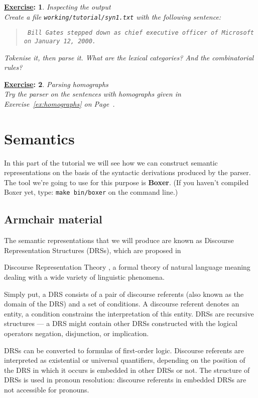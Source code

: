 \documentclass[11pt]{article}
\newtheorem{exercisebb}{\textbf{\underline{Exercise}:}}[section]
\newcommand{\bx}[1]{\begin{exercisebb} \rm #1\\}
\newcommand{\ex}{\end{exercisebb}}
\newcommand{\mnote}[1]
{
  \marginpar{\small #1}
  #1
}
\begin{document}
\bx{Inspecting the output}

Create a file \texttt{working/tutorial/syn1.txt} with the following sentence:

\begin{quote}\tt
Bill Gates stepped down as chief executive officer of Microsoft\\
on January 12, 2000.
\end{quote}

Tokenise it, then parse it. What are the lexical categories? 
And the combinatorial rules?
\ex

\bx{Parsing homographs}
Try the parser on the sentences with homographs given in Exercise~\ref{ex:homographs} on Page~\pageref{ex:homographs}.
\ex




%
%
\clearpage
\section{Semantics}\label{section:semantics}

In this part of the tutorial we will see how we can construct semantic
representations on the basis of the syntactic derivations produced by
the parser. The tool we're going to use for this purpose is
\textbf{Boxer}.  (If you haven't compiled \mnote{Boxer} yet, type:
\texttt{make bin/boxer} on the command line.)

\subsection*{Armchair material}

The semantic representations that we will produce are known as
Discourse Representation Structures (DRSs), which are proposed in
\mnote{Discourse Representation Theory}, a formal theory of natural
language meaning dealing with a wide variety of linguistic phenomena.

Simply put, a DRS consists of a pair of discourse referents
(also known as the domain of the DRS) and a set of conditions.  A
discourse referent denotes an entity, a condition constrains the
interpretation of this entity. DRSs are recursive structures --- a DRS
might contain other DRSs constructed with the logical operators
negation, disjunction, or implication. 

DRSs can be converted to formulas of first-order logic.  Discourse
referents are interpreted as existential or universal quantifiers,
depending on the position of the DRS in which it occurs is embedded in
other DRSs or not. The structure of DRSs is used in pronoun
resolution: discourse referents in embedded DRSs are not accessible
for pronouns. 
\end{document}
